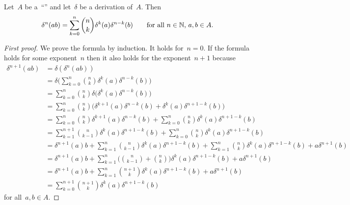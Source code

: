 \begin{lemma}
	Let~$A$ be a~\enquote{\algebra{$\kf$}} and let~$\delta$ be a derivation of~$A$.
	Then
	\[
		\delta^n(ab)
		=
		\sum_{k=0}^n
		\binom{n}{k}
		\delta^k(a) \delta^{n-k}(b)
		\qquad
		\text{for all~$n \in \mathbb{N}$,~$a, b \in A$.}
	\]
\end{lemma}


\begin{proof}[First proof]
	We prove the formula by induction.
	It holds for~$n = 0$.
	If the formula holds for some exponent~$n$ then it also holds for the exponent~$n + 1$ because
	\begingroup
	\allowdisplaybreaks
	\begin{align*}
		\delta^{n+1}(ab)
		&=
		\delta( \delta^n(ab) )
		\\
		&=
		\delta
		\Biggl(
			\sum_{k=0}^n
			\binom{n}{k}
			\delta^k(a) \delta^{n-k}(b)
		\Biggr)
		\\
		&=
		\sum_{k=0}^n
		\binom{n}{k}
		\delta
		\bigl(
			\delta^k(a) \delta^{n-k}(b)
		\bigr)
		\\
		&=
		\sum_{k=0}^n
		\binom{n}{k}
		\bigl(
			\delta^{k+1}(a) \delta^{n-k}(b)
			+
			\delta^k(a) \delta^{n+1-k}(b)
		\bigr)
		\\
		&=
		\sum_{k=0}^n
		\binom{n}{k}
		\delta^{k+1}(a) \delta^{n-k}(b)
		+
		\sum_{k=0}^n
		\binom{n}{k}
		\delta^k(a) \delta^{n+1-k}(b)
		\\
		&=
		\sum_{k=1}^{n+1}
		\binom{n}{k-1}
		\delta^{k}(a) \delta^{n+1-k}(b)
		+
		\sum_{k=0}^n
		\binom{n}{k}
		\delta^k(a) \delta^{n+1-k}(b)
		\\
		&=
		\delta^{n+1}(a) b
		+
		\sum_{k=1}^n
		\binom{n}{k-1}
		\delta^{k}(a) \delta^{n+1-k}(b)
		+
		\sum_{k=1}^n
		\binom{n}{k}
		\delta^k(a) \delta^{n+1-k}(b)
		+
		a \delta^{n+1}(b)
		\\
		&=
		\delta^{n+1}(a) b
		+
		\sum_{k=1}^n
		\Biggl(
			\binom{n}{k-1}
			+
			\binom{n}{k}
		\Biggr)
		\delta^k(a) \delta^{n+1-k}(b)
		+
		a \delta^{n+1}(b)
		\\
		&=
		\delta^{n+1}(a) b
		+
		\sum_{k=1}^n
		\binom{n+1}{k}
		\delta^k(a) \delta^{n+1-k}(b)
		+
		a \delta^{n+1}(b)
		\\
		&=
		\sum_{k=0}^{n+1}
		\binom{n+1}{k}
		\delta^k(a) \delta^{n+1-k}(b)
	\end{align*}
	\endgroup
	for all~$a, b \in A$.
\end{proof}


